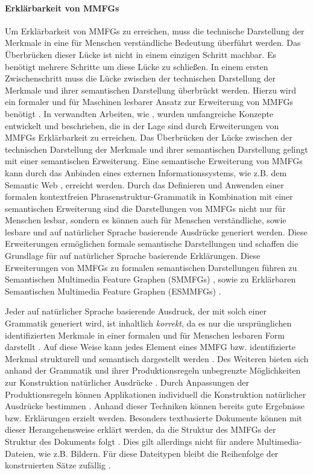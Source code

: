 \paragraph{Erklärbarkeit von MMFGs}
\label{sec2:sota:par:explainability-of-mmfgs}
Um Erklärbarkeit von MMFGs zu erreichen, muss die technische Darstellung der Merkmale in eine für Menschen verständliche Bedeutung überführt werden.
Das Überbrücken dieser Lücke ist nicht in einem einzigen Schritt machbar.
Es benötigt mehrere Schritte um diese Lücke zu schließen.
In einem ersten Zwischenschritt muss die Lücke zwischen der technischen Darstellung der Merkmale und ihrer semantischen Darstellung überbrückt werden.
Hierzu wird ein formaler und für Maschinen lesbarer Ansatz zur Erweiterung von MMFGs benötigt \cite{towards_auto_sem_expl_mmfg}.
In verwandten Arbeiten, wie \cite{towards_auto_sem_expl_mmfg}, wurden umfangreiche Konzepte entwickelt und beschrieben, die in der Lage sind durch Erweiterungen von MMFGs Erklärbarkeit zu erreichen.
Das Überbrücken der Lücke zwischen der technischen Darstellung der Merkmale und ihrer semantischen Darstellung gelingt mit einer semantischen Erweiterung.
Eine semantische Erweiterung von MMFGs kann durch das Anbinden eines externen Informationssystems, wie z.B. dem Semantic Web \cite{sem-web}, erreicht werden.
Durch das Definieren und Anwenden einer formalen kontextfreien Phrasenstruktur-Grammatik \cite{hausser-ps-grammar} in Kombination mit einer semantischen Erweiterung sind die Darstellungen von MMFGs nicht nur für Menschen lesbar, sondern es können auch für Menschen verständliche, sowie lesbare und auf natürlicher Sprache basierende Ausdrücke generiert werden.
Diese Erweiterungen ermöglichen formale semantische Darstellungen und schaffen die Grundlage für auf natürlicher Sprache basierende Erklärungen.
Diese Erweiterungen von MMFGs zu formalen semantischen Darstellungen führen zu Semantischen Multimedia Feature Graphen (SMMFGs) \cite{towards_auto_sem_expl_mmfg}, sowie zu Erklärbaren Semantischen Multimedia Feature Graphen (ESMMFGs) \cite{towards_auto_sem_expl_mmfg}.

Jeder auf natürlicher Sprache basierende Ausdruck, der mit solch einer Grammatik generiert wird, ist inhaltlich \textit{korrekt}, da es nur die ursprünglichen identifizierten Merkmale in einer formalen und für Menschen lesbaren Form darstellt \cite{towards_auto_sem_expl_mmfg}.
Auf diese Weise kann jedes Element eines MMFG bzw. identifizierte Merkmal strukturell und semantisch dargestellt werden \cite{towards_auto_sem_expl_mmfg}.
Des Weiteren bieten sich anhand der Grammatik und ihrer Produktionsregeln unbegrenzte Möglichkeiten zur Konstruktion natürlicher Ausdrücke \cite{towards_auto_sem_expl_mmfg}.
Durch Anpassungen der Produktionsregeln können Applikationen individuell die Konstruktion natürlicher Ausdrücke bestimmen \cite{towards_auto_sem_expl_mmfg}.
Anhand dieser Techniken können bereits gute Ergebnisse bzw. Erklärungen erzielt werden.
Besonders textbasierte Dokumente können mit dieser Herangehensweise erklärt werden, da die Struktur des MMFGs der Struktur des Dokuments folgt \cite{towards_auto_sem_expl_mmfg}.
Dies gilt allerdings nicht für andere Multimedia-Dateien, wie z.B. Bildern.
Für diese Dateitypen bleibt die Reihenfolge der konstruierten Sätze zufällig \cite{towards_auto_sem_expl_mmfg}.

